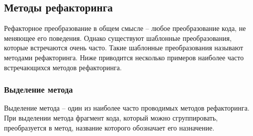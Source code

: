 \subsection{Методы рефакторинга}
Рефакторное преобразование в общем смысле -- любое преобразование кода, не меняющее его поведения.
Однако существуют шаблонные преобразования, которые встречаются очень часто.
Такие шаблонные преобразования называют методами рефакторинга.
Ниже приводится несколько примеров наиболее часто встречающихся методов рефакторинга.
\subsubsection{Выделение метода}
Выделение метода -- один из наиболее часто проводимых методов рефакторинга.
При выделении метода фрагмент кода, который можно сгруппировать, преобразуется в метод,
название которого обозначает его назначение.

